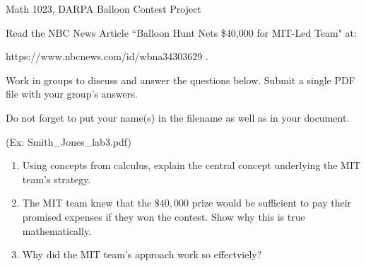 \documentclass[12pt]{article}
\begin{document}
\begin{large}
\noindent Math 1023, DARPA Balloon Contest Project
\end{large} \newline

\noindent Read the NBC News Article  ``Balloon Hunt Nets \$40,000 for MIT-Led Team" at:
\newline 

\noindent https://www.nbcnews.com/id/wbna34303629 . \newline


\noindent Work in groups to discuss and answer the questions below.  Submit a single PDF file with your group's answers. \newline

\noindent Do not forget to put your name(s) in the filename as well as in your document. \newline

\noindent (Ex: Smith\_Jones\_lab3.pdf)

\begin{enumerate}
	\item Using concepts from calculus, explain the central concept underlying the MIT team's strategy.

	\item The MIT team knew that the $\$40,000$ prize would be sufficient to pay their promised expenses if they won the contest.  Show why this is true mathematically.

	\item Why did the MIT team's approach work so effectviely?


	
\end{enumerate}
\end{document}
